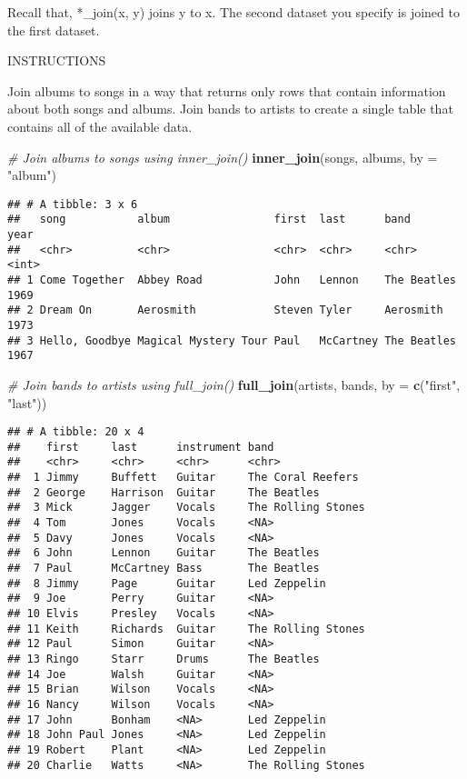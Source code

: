 \documentclass[]{article}
\newenvironment{Shaded}{\begin{snugshade}}{\end{snugshade}}
\newcommand{\KeywordTok}[1]{\textcolor[rgb]{0.13,0.29,0.53}{\textbf{#1}}}
\newcommand{\DataTypeTok}[1]{\textcolor[rgb]{0.13,0.29,0.53}{#1}}
\newcommand{\StringTok}[1]{\textcolor[rgb]{0.31,0.60,0.02}{#1}}
\newcommand{\CommentTok}[1]{\textcolor[rgb]{0.56,0.35,0.01}{\textit{#1}}}
\newcommand{\NormalTok}[1]{#1}
\begin{document}
Recall that, *\_join(x, y) joins y to x. The second dataset you specify
is joined to the first dataset.

INSTRUCTIONS

Join albums to songs in a way that returns only rows that contain
information about both songs and albums. Join bands to artists to create
a single table that contains all of the available data.

\begin{Shaded}
\begin{Highlighting}[]
\CommentTok{# Join albums to songs using inner_join()}
\KeywordTok{inner_join}\NormalTok{(songs, albums, }\DataTypeTok{by =} \StringTok{"album"}\NormalTok{)}
\end{Highlighting}
\end{Shaded}

\begin{verbatim}
## # A tibble: 3 x 6
##   song           album                first  last      band         year
##   <chr>          <chr>                <chr>  <chr>     <chr>       <int>
## 1 Come Together  Abbey Road           John   Lennon    The Beatles  1969
## 2 Dream On       Aerosmith            Steven Tyler     Aerosmith    1973
## 3 Hello, Goodbye Magical Mystery Tour Paul   McCartney The Beatles  1967
\end{verbatim}

\begin{Shaded}
\begin{Highlighting}[]
\CommentTok{# Join bands to artists using full_join()}
\KeywordTok{full_join}\NormalTok{(artists, bands, }\DataTypeTok{by =} \KeywordTok{c}\NormalTok{(}\StringTok{"first"}\NormalTok{, }\StringTok{"last"}\NormalTok{))}
\end{Highlighting}
\end{Shaded}

\begin{verbatim}
## # A tibble: 20 x 4
##    first     last      instrument band              
##    <chr>     <chr>     <chr>      <chr>             
##  1 Jimmy     Buffett   Guitar     The Coral Reefers 
##  2 George    Harrison  Guitar     The Beatles       
##  3 Mick      Jagger    Vocals     The Rolling Stones
##  4 Tom       Jones     Vocals     <NA>              
##  5 Davy      Jones     Vocals     <NA>              
##  6 John      Lennon    Guitar     The Beatles       
##  7 Paul      McCartney Bass       The Beatles       
##  8 Jimmy     Page      Guitar     Led Zeppelin      
##  9 Joe       Perry     Guitar     <NA>              
## 10 Elvis     Presley   Vocals     <NA>              
## 11 Keith     Richards  Guitar     The Rolling Stones
## 12 Paul      Simon     Guitar     <NA>              
## 13 Ringo     Starr     Drums      The Beatles       
## 14 Joe       Walsh     Guitar     <NA>              
## 15 Brian     Wilson    Vocals     <NA>              
## 16 Nancy     Wilson    Vocals     <NA>              
## 17 John      Bonham    <NA>       Led Zeppelin      
## 18 John Paul Jones     <NA>       Led Zeppelin      
## 19 Robert    Plant     <NA>       Led Zeppelin      
## 20 Charlie   Watts     <NA>       The Rolling Stones
\end{verbatim}
\end{document}
